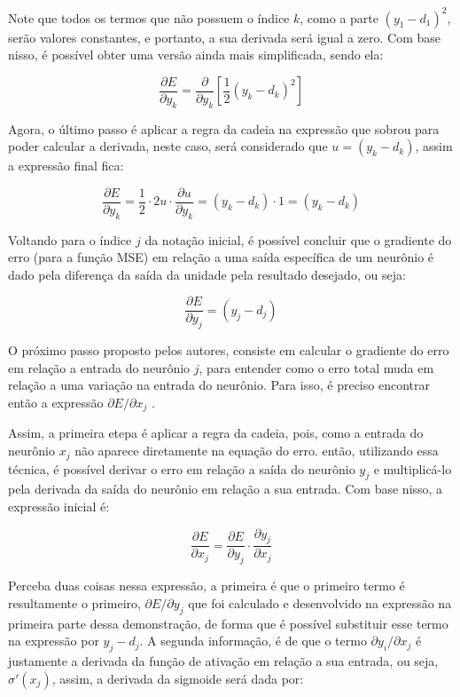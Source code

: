 Note que todos os termos que não possuem o índice $k$, como a parte $(y_1 - d_1)^2$, serão valores constantes, e portanto, a sua derivada será igual a zero. Com base nisso, é possível obter uma versão ainda mais simplificada, sendo ela:

\[
    \frac{\partial E}{\partial y_k} = \frac{\partial}{\partial y_k} \left[ \frac{1}{2} (y_k - d_k)^2 \right]
\]

Agora, o último passo é aplicar a regra da cadeia na expressão que sobrou para poder calcular a derivada, neste caso, será considerado que $u = (y_k - d_k)$, assim a expressão final fica:

\[
    \frac{\partial E}{\partial y_k} = \frac{1}{2} \cdot 2u \cdot \frac{\partial u}{\partial y_k} = (y_k - d_k) \cdot 1 = (y_k - d_k)
\]

Voltando para o índice $j$ da notação inicial, é possível concluir que o gradiente do erro (para a função MSE) em relação a uma saída específica de um neurônio é dado pela diferença da saída da unidade pela resultado desejado, ou seja:

\[
    \frac{\partial E}{\partial y_j} = (y_j - d_j) 
\]

O próximo passo proposto pelos autores, consiste em calcular o gradiente do erro em relação a entrada do neurônio $j$, para entender como o erro total muda em relação a uma variação na entrada do neurônio. Para isso, é preciso encontrar então a expressão $\partial E / \partial x_j$ \parencite{BackpropagationArticle}.

Assim, a primeira etepa é aplicar a regra da cadeia, pois, como a entrada do neurônio $x_j$ não aparece diretamente na equação do erro. então, utilizando essa técnica, é possível derivar o erro em relação a saída do neurônio $y_j$ e multiplicá-lo pela derivada da saída do neurônio em relação a sua entrada. Com base nisso, a expressão inicial é:

\[
    \frac{\partial E}{\partial x_j} = \frac{\partial E}{\partial y_j} \cdot \frac{\partial y_j}{\partial x_j}
\]

Perceba duas coisas nessa expressão, a primeira é que o primeiro termo é resultamente o primeiro, $\partial E / \partial y_j$ que foi calculado e desenvolvido na expressão na primeira parte dessa demonstração, de forma que é possível substituir esse termo na expressão por $y_j - d_j$. A segunda informação, é de que o termo $\partial y_i / \partial x_j$ é justamente a derivada da função de ativação em relação a sua entrada, ou seja, $\sigma'(x_j)$, assim, a derivada da sigmoide será dada por:

